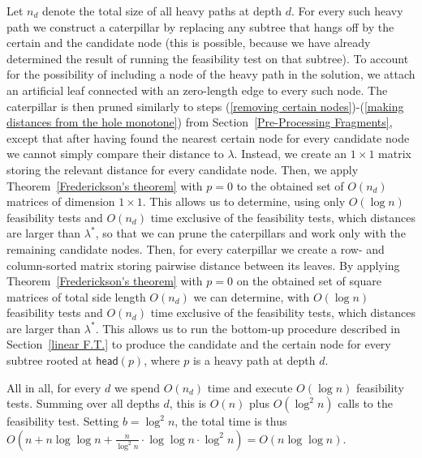\documentclass[a4paper,UKenglish]{lipics-v2016}
\theoremstyle{plain}
\newcommand{\head}{\textsf{head}}
\begin{document}
Let $n_{d}$ denote the total size of all heavy paths at depth $d$. For every such heavy path we construct a caterpillar by replacing
any subtree that hangs off by the certain and the candidate node (this is possible, because we have already determined the result of
running the feasibility test on that subtree). To account for the possibility of including a node of the heavy path in the solution,
we attach an artificial leaf connected with an zero-length edge to every such node.
The caterpillar is then pruned similarly to steps (\ref{removing certain nodes})-(\ref{making distances from the hole monotone})
from Section~\ref{Pre-Processing Fragments}, except that after having found the nearest certain node for every candidate
node we cannot simply compare their distance to $\lambda$. Instead, we create an $1\times 1$ matrix storing the relevant
distance for every candidate node. Then, we apply Theorem~\ref{Frederickson's theorem} with $p=0$ to the obtained set of
$O(n_{d})$ matrices of dimension $1\times 1$. This allows us to determine, using only $O(\log n)$ feasibility tests and
$O(n_{d})$ time exclusive of the feasibility tests, which distances are larger than $\lambda^{*}$, so that we can prune
the caterpillars and work only with the remaining candidate nodes. Then, for every caterpillar we create a row- and column-sorted matrix
storing pairwise distance between its leaves. By applying Theorem~\ref{Frederickson's theorem} with $p=0$ on the obtained set of
square matrices of total side length $O(n_{d})$ we can determine, with $O(\log n)$ feasibility tests and $O(n_{d})$ time
exclusive of the feasibility tests, which distances are larger than $\lambda^{*}$. This allows us to run the bottom-up
procedure described in Section~\ref{linear F.T.} to produce the candidate and the certain node for every subtree rooted
at $\head(p)$, where $p$ is a heavy path at depth $d$.

All in all, for every $d$ we spend $O(n_{d})$ time and execute $O(\log n)$ feasibility tests. Summing over all depths $d$,
this is $O(n)$ plus $O(\log^{2}n)$ calls to the feasibility test. Setting $b=\log^{2}n$, the total time is thus $O(n+n\log\log n+\frac{n}{\log^{2}n}\cdot\log\log n\cdot \log^{2}n)=O(n\log\log n)$.
\end{document}
